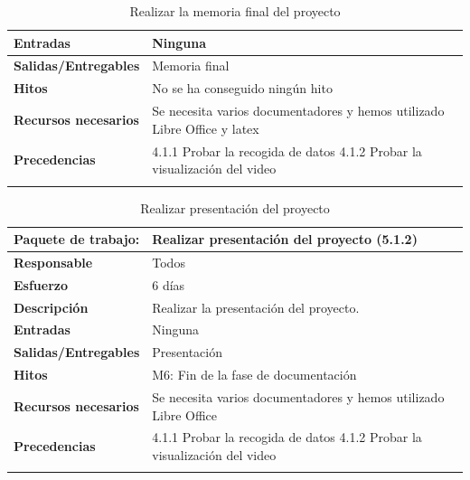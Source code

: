\documentclass{report}
\begin{document}
\begin{center}
\begin{longtable}{|p{6cm}|p{6cm}|}
                    \hline
                    \textbf{Entradas} & Ninguna\\
                    \hline
                    \textbf{Salidas/Entregables} & Memoria final\\
                    \hline
                    \textbf{Hitos} & No se ha conseguido ningún hito\\
                    \hline
                    \textbf{Recursos necesarios} & Se necesita varios documentadores y hemos utilizado Libre Office y latex\\
                    \hline
                    \textbf{Precedencias} & 4.1.1 Probar la recogida de datos
                                            4.1.2 Probar la visualización del video\\
                    \hline
                    \caption{Realizar la memoria final del proyecto}
                \end{longtable}
                \clearpage
                \begin{longtable}{|p{6cm}|p{6cm}|}
                    \hline
                    \textbf{Paquete de trabajo:} & Realizar presentación del proyecto (5.1.2)\\
                    \hline
                    \textbf{Responsable} & Todos\\
                    \hline
                    \textbf{Esfuerzo} & 6 días\\
                    \hline
                    \textbf{Descripción} & Realizar la presentación del proyecto.\\
                    \hline
                    \textbf{Entradas} & Ninguna\\
                    \hline
                    \textbf{Salidas/Entregables} & Presentación\\
                    \hline
                    \textbf{Hitos} & M6: Fin de la fase de documentación\\
                    \hline
                    \textbf{Recursos necesarios} & Se necesita varios documentadores y hemos utilizado Libre Office\\
                    \hline
                    \textbf{Precedencias} & 4.1.1 Probar la recogida de datos
                                            4.1.2 Probar la visualización del video\\
                    \hline
                    \caption{Realizar presentación del proyecto}
                \end{longtable}
            \end{center}
\end{document}
